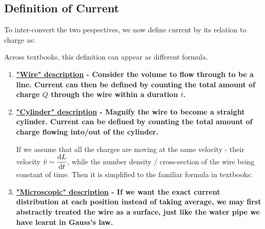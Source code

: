 \documentclass[class=article, crop=false, 12pt]{standalone}
\begin{document}
\subsection{Definition of Current}

To inter-convert the two pespectives, 
we now define current by its relation to charge as:
\begin{center}
\end{center}

Across textbooks, this definition can appear as different formula.
\begin{enumerate}
    \item \bf{\ul{"Wire" description}} - 
    Consider the volume to flow through to be a line. 
    Current can then be defined by counting the total amount of charge $Q$ through the wire within a duration $t$. 

    \item \bf{\ul{"Cylinder" description}} - 
    Magnify the wire to become a straight cylinder.
    Current can be defined by counting the total amount of charge 
    flowing into/out of the cylinder. 

    If we assume that all the charges are moving at the same velocity - 
    their \cul[red]{average} velocity $\bar{v}\sim\dvv{L}{t}$,
    while the number density / cross-section of the wire being constant of time. 
    Then it is simplified to the familiar formula in textbooks:


    \item \bf{\ul{"Microscopic" description}} - 
    If we want the exact current distribution at each position instead of taking average,
    we may first abstractly treated the wire as a surface,
    just like the water pipe we have learnt in Gauss's law. 


\end{enumerate}
\end{document}
